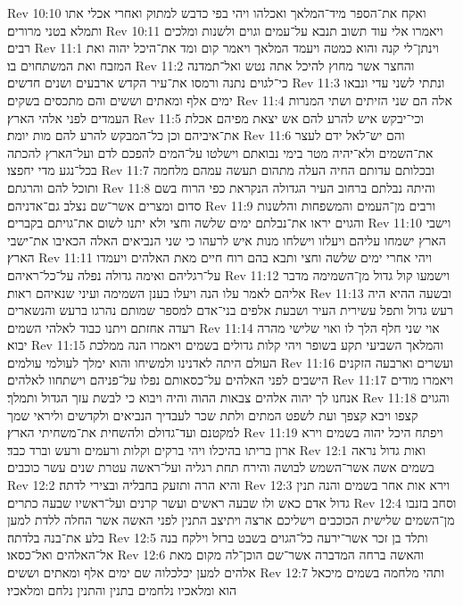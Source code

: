 Rev 10:10  ואקח את־הספר מיד־המלאך ואכלהו ויהי בפי כדבש למתוק ואחרי אכלי אתו ותמלא בטני מרורים׃
Rev 10:11  ויאמרו אלי עוד תשוב תנבא על־עמים וגוים ולשנות ומלכים רבים׃
Rev 11:1  וינתן־לי קנה והוא כמטה ויעמד המלאך ויאמר קום ומד את־היכל יהוה ואת המזבח ואת המשתחוים בו׃
Rev 11:2  והחצר אשר מחוץ להיכל אתה נטש ואל־תמדנה כי־לגוים נתנה ורמסו את־עיר הקדש ארבעים ושנים חדשים׃
Rev 11:3  ונתתי לשני עדי ונבאו ימים אלף ומאתים וששים והם מתכסים בשקים׃
Rev 11:4  אלה הם שני הזיתים ושתי המנרות העמדים לפני אלהי הארץ׃
Rev 11:5  וכי־יבקש איש להרע להם אש יצאת מפיהם אכלת את־איביהם וכן כל־המבקש להרע להם מות יומת׃
Rev 11:6  והם יש־לאל ידם לעצר את־השמים ולא־יהיה מטר בימי נבואתם וישלטו על־המים להפכם לדם ועל־הארץ להכתה בכל־נגע מדי יחפצו׃
Rev 11:7  ובכלותם עדותם החיה העלה מתהום תעשה עמהם מלחמה ותוכל להם והרגתם׃
Rev 11:8  והיתה נבלתם ברחוב העיר הגדולה הנקראת כפי הרוח בשם סדום ומצרים אשר־שם נצלב גם־אדניהם׃
Rev 11:9  ורבים מן־העמים והמשפחות והלשנות והגוים יראו את־נבלתם ימים שלשה וחצי ולא יתנו לשום את־גויתם בקברים׃
Rev 11:10  וישבי הארץ ישמחו עליהם ויעלזו וישלחו מנות איש לרעהו כי שני הנביאים האלה הכאיבו את־ישבי הארץ׃
Rev 11:11  ויהי אחרי ימים שלשה וחצי ותבא בהם רוח חיים מאת האלהים ויעמדו על־רגליהם ואימה גדולה נפלה על־כל־ראיהם׃
Rev 11:12  וישמעו קול גדול מן־השמימה מדבר אליהם לאמר עלו הנה ויעלו בענן השמימה ועיני שנאיהם ראות׃
Rev 11:13  ובשעה ההיא היה רעש גדול ותפל עשירית העיר ושבעת אלפים בני־אדם למספר שמותם נהרגו ברעש והנשארים רעדה אחזתם ויתנו כבוד לאלהי השמים׃
Rev 11:14  אוי שני חלף הלך לו ואוי שלישי מהרה יבוא׃
Rev 11:15  והמלאך השביעי תקע בשופר ויהי קלות גדולים בשמים ויאמרו הנה ממלכת העולם היתה לאדנינו ולמשיחו והוא ימלך לעולמי עולמים׃
Rev 11:16  ועשרים וארבעה הזקנים הישבים לפני האלהים על־כסאותם נפלו על־פניהם וישתחוו לאלהים׃
Rev 11:17  ויאמרו מודים אנחנו לך יהוה אלהים צבאות ההוה והיה ויבוא כי לבשת עזך הגדול ותמלך׃
Rev 11:18  והגוים קצפו ויבא קצפך ועת לשפט המתים ולתת שכר לעבדיך הנביאים ולקדשים וליראי שמך למקטנם ועד־גדולם ולהשחית את־משחיתי הארץ׃
Rev 11:19  ויפתח היכל יהוה בשמים וירא ארון בריתו בהיכלו ויהי ברקים וקלות ורעמים ורעש וברד כבד׃
Rev 12:1  ואות גדול נראה בשמים אשה אשר־השמש לבושה והירח תחת רגליה ועל־ראשה עטרת שנים עשר כוכבים׃
Rev 12:2  והיא הרה ותזעק בחבליה ובצירי לדתה׃
Rev 12:3  וירא אות אחר בשמים והנה תנין גדול אדם כאש ולו שבעה ראשים ועשר קרנים ועל־ראשיו שבעה כתרים׃
Rev 12:4  וסחב בזנבו מן־השמים שלישית הכוכבים וישליכם ארצה ויתיצב התנין לפני האשה אשר החלה ללדת למען בלע את־בנה בלדתה׃
Rev 12:5  ותלד בן זכר אשר־ירעה כל־הגוים בשבט ברזל וילקח בנה אל־האלהים ואל־כסאו׃
Rev 12:6  והאשה ברחה המדברה אשר־שם הוכן־לה מקום מאת אלהים למען יכלכלוה שם ימים אלף ומאתים וששים׃
Rev 12:7  ותהי מלחמה בשמים מיכאל הוא ומלאכיו נלחמים בתנין והתנין נלחם ומלאכיו׃
